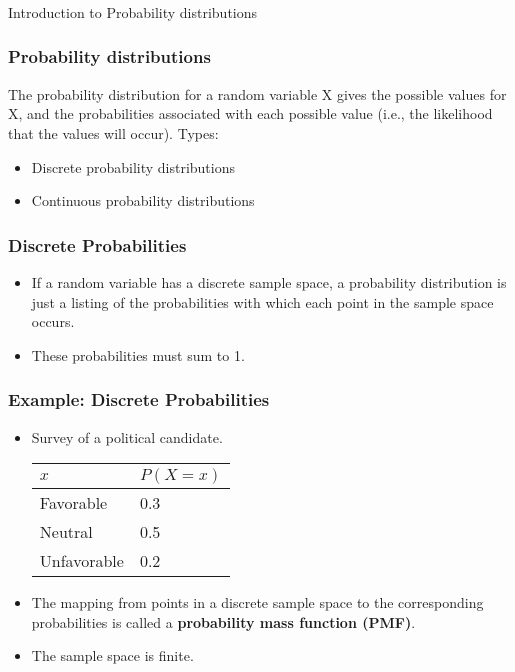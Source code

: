 \begin{frame}[fragile]\frametitle{}
\begin{center}
{\Large Introduction to Probability distributions}
\end{center}
\end{frame}


\begin{frame}
\frametitle{Probability distributions}
The probability distribution for a random variable X gives the possible 
values for X, and the probabilities associated with each possible value 
(i.e., the likelihood that the values will occur). 
Types:
\begin{itemize}
\item Discrete probability distributions 
\item Continuous probability distributions 
\end{itemize}
\end{frame}

\begin{frame}
\frametitle{Discrete Probabilities}

\begin{itemize}
\item If a random variable has a discrete sample space, a probability
distribution is just a listing of the probabilities with which each
point in the sample space occurs.  
\item These probabilities must sum to 1.
\end{itemize}
\end{frame}


\begin{frame}
\frametitle{Example: Discrete Probabilities}

\begin{itemize}
\item Survey of a political candidate.  

\begin{center}
\begin{tabular}{ll}
{$x$} & {$P(X=x)$}\\\hline Favorable & \hspace{0.8cm}0.3 \\ Neutral
& \hspace{0.8cm}0.5 \\ Unfavorable & \hspace{0.8cm}0.2 \\\hline
\end{tabular}
\end{center}

\item
The mapping from points in a discrete sample space to the
corresponding probabilities is called a {\bf probability mass function
  (PMF)}.
\item
The sample space is finite.
\end{itemize}
\end{frame}

